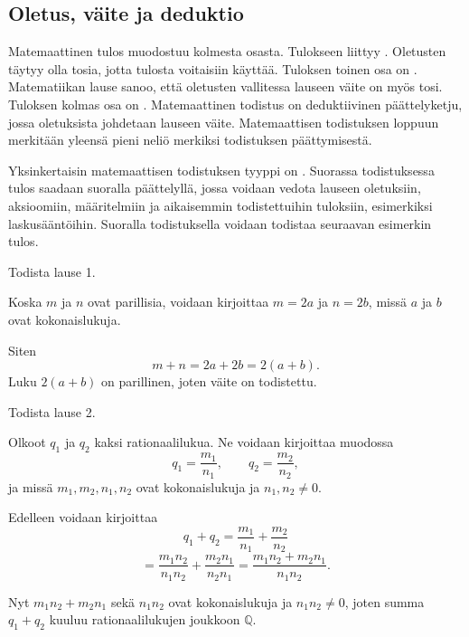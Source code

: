 \subsection*{Oletus, väite ja deduktio} %

Matemaattinen tulos muodostuu kolmesta osasta. Tulokseen liittyy .
Oletusten täytyy olla tosia, jotta tulosta voitaisiin käyttää. Tuloksen toinen osa on .
Matematiikan lause sanoo, että oletusten vallitessa lauseen väite on myös tosi.
Tuloksen kolmas osa on . Matemaattinen todistus on deduktiivinen päättelyketju,
jossa oletuksista johdetaan lauseen väite. Matemaattisen todistuksen loppuun merkitään yleensä
pieni neliö merkiksi todistuksen päättymisestä.

Yksinkertaisin matemaattisen todistuksen tyyppi on .
Suorassa todistuksessa tulos saadaan suoralla päättelyllä, jossa voidaan vedota lauseen oletuksiin,
aksioomiin, määritelmiin ja aikaisemmin todistettuihin tuloksiin, esimerkiksi laskusääntöihin.
Suoralla todistuksella voidaan todistaa seuraavan esimerkin tulos.


\begin{esimerkki}
	Todista lause 1.
	
	\begin{todistus}
		Koska $m$ ja $n$ ovat parillisia, voidaan kirjoittaa $m=2a$ ja $n=2b$, missä $a$ ja $b$ ovat kokonaislukuja.
		
		Siten
		\[
			m+n =2a+2b = 2(a+b).
		\]
		Luku $2(a+b)$ on parillinen, joten väite on todistettu.
	\end{todistus}
\end{esimerkki}


\begin{esimerkki}
	Todista lause 2.
	
	\begin{todistus}
		Olkoot $q_1$ ja $q_2$ kaksi rationaalilukua. Ne voidaan kirjoittaa muodossa
		\[
			q_1=\frac{m_1}{n_1},\qquad 
			q_2=\frac{m_2}{n_2},
		\]
		ja missä $m_1,m_2,n_1,n_2$ ovat kokonaislukuja ja $n_1,n_2\neq 0$.

		Edelleen voidaan kirjoittaa
		\[
			q_1+q_2 = \frac{m_1}{n_1}+ \frac{m_2}{n_2}
		\]
		\[
			= \frac{m_1 n_2}{n_1 n_2}+ \frac{m_2 n_1}{n_2 n_1} = \frac{m_1n_2 + m_2 n_1}{n_1 n_2}.
		\]

		Nyt $m_1n_2 + m_2 n_1$ sekä $n_1 n_2$ ovat kokonaislukuja ja $n_1 n_2\neq 0$, joten summa $q_1+q_2$ kuuluu rationaalilukujen joukkoon $\mathbb{Q}$.
	\end{todistus}
\end{esimerkki}

